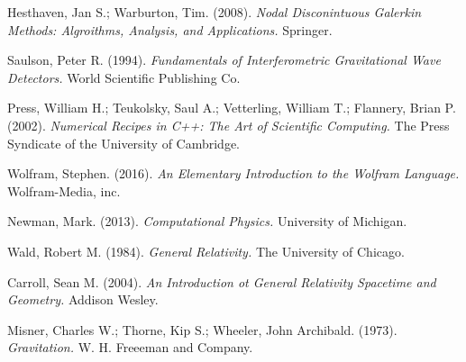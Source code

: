  Hesthaven, Jan S.; Warburton, Tim. (2008). {\em Nodal Disconintuous Galerkin Methods: Algroithms, Analysis, and Applications.} Springer.

 Saulson, Peter R. (1994). {\em Fundamentals of Interferometric Gravitational Wave Detectors.} World Scientific Publishing Co.

 Press, William H.; Teukolsky, Saul A.; Vetterling, William T.; Flannery, Brian P. (2002). {\em Numerical Recipes in C++: The Art of Scientific Computing.} The Press Syndicate of the University of Cambridge.

 Wolfram, Stephen. (2016). {\em An Elementary Introduction to the Wolfram Language.} Wolfram-Media, inc.

 Newman, Mark. (2013). {\em Computational Physics.} University of Michigan.

Wald, Robert M. (1984). {\em General Relativity.} The University of Chicago.

Carroll, Sean M. (2004). {\em An Introduction ot General Relativity Spacetime and Geometry.} Addison Wesley.

Misner, Charles W.; Thorne, Kip S.; Wheeler, John Archibald. (1973). {\em Gravitation.} W. H. Freeeman and Company. 

